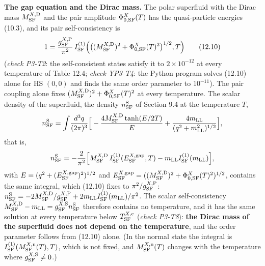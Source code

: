 \documentclass[
  10pt,
]{article}
\begin{document}
\textbf{The gap equation and the Dirac mass.} The polar superfluid with
the Dirac mass \(M^{X,{\rm D}}_{\rm SF}\) and the pair amplitude
\(\Phi^X_{0,{\rm SF}}(T)\) has the quasi-particle energies (10.3), and
its pair self-consistency is
\[1=\frac{g^{X,{\rm P}}_{\rm SF}}{\pi^2}\,I^{(1)}_{\rm SF}\Big(\big((M^{X,{\rm D}}_{\rm SF})^2+\Phi^X_{0,{\rm SF}}(T)^2\big)^{1/2},T\Big)\tag{12.10}\]
(\emph{check P3-T2}: the self-consistent states satisfy it to
\(2\times10^{-12}\) at every temperature of Table 12.4; \emph{check
YP3-T4}: the Python program solves (12.10) alone for HS \((0,0)\) and
finds the same order parameter to \(10^{-11}\)). The pair coupling alone
fixes \((M^{X,{\rm D}}_{\rm SF})^2+\Phi^X_{0,{\rm SF}}(T)^2\) at every
temperature. The scalar density of the superfluid, the density
\(n^{\rm S}_{\rm SF}\) of Section 9.4 at the temperature \(T\),
\[n^{\rm S}_{\rm SF}=\int\!\frac{d^3q}{(2\pi)^3}\Big[-\frac{4M^{X,{\rm D}}_{\rm SF}\tanh(E/2T)}{E}+\frac{4m_{\rm LL}}{(q^2+m_{\rm LL}^2)^{1/2}}\Big],\]
that is,
\[n^{\rm S}_{\rm SF}=-\frac2{\pi^2}\Big[M^{X,{\rm D}}_{\rm SF}\,I^{(1)}_{\rm SF}(E^{X,{\rm gap}}_{\rm SF},T)-m_{\rm LL}I^{(1)}_{\rm SF}(m_{\rm LL})\Big],\]
with \(E=(q^2+(E^{X,{\rm gap}}_{\rm SF})^2)^{1/2}\) and
\(E^{X,{\rm gap}}_{\rm SF}=((M^{X,{\rm D}}_{\rm SF})^2+\Phi^X_{0,{\rm SF}}(T)^2)^{1/2}\),
contains the same integral, which (12.10) fixes to
\(\pi^2/g^{X,{\rm P}}_{\rm SF}\):
\(n^{\rm S}_{\rm SF}=-2M^{X,{\rm D}}_{\rm SF}/g^{X,{\rm P}}_{\rm SF}+2m_{\rm LL}I^{(1)}_{\rm SF}(m_{\rm LL})/\pi^2\).
The scalar self-consistency
\(M^{X,{\rm D}}_{\rm SF}-m_{\rm LL}=g^{X,{\rm S}}_{\rm SF}n^{\rm S}_{\rm SF}\)
therefore contains no temperature, and it has the same solution at every
temperature below \(T^{X,{\rm c}}_{\rm SF}\) (\emph{check P3-T8}):
\textbf{the Dirac mass of the superfluid does not depend on the
temperature}, and the order parameter follows from (12.10) alone. (In
the normal state the integral is
\(I^{(1)}_{\rm SF}(M^{X,{\rm n}}_{\rm SF}(T),T)\), which is not fixed,
and \(M^{X,{\rm n}}_{\rm SF}(T)\) changes with the temperature where
\(g^{X,{\rm S}}_{\rm SF}\ne0\).)
\end{document}
